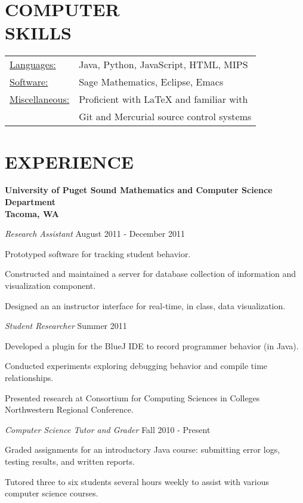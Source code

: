 \documentclass[line,margin,11pt]{res}
\newenvironment{itemize*}%
  {\begin{itemize}%
    \setlength{\parsep}{0pt}
    \setlength{\itemsep}{0pt}%
    \setlength{\parskip}{0pt}}%
  {\end{itemize}}
\begin{document}
\begin{resume}
\vspace*{.2cm}

\section{COMPUTER \\ SKILLS}
\begin{tabular}{l l}
   \underline{Languages:} & Java, Python, JavaScript, HTML, MIPS\\
   \underline{Software:} & Sage Mathematics, Eclipse, Emacs\\
   \underline{Miscellaneous:} & Proficient with LaTeX and familiar with\\
        & Git and Mercurial source control systems
  \end{tabular}

\vspace*{.2cm} 

\section{EXPERIENCE} 
\textbf{University of Puget Sound
Mathematics and Computer Science Department\\
Tacoma, WA}

{\sl Research Assistant} \hfill August 2011 - December 2011
\begin{itemize*}
    \item Prototyped software for tracking student behavior.
    \item Constructed and maintained a server for database collection of 
      information and visualization component.
    \item Designed an an instructor interface for real-time, in class, data 
      visualization.
\end{itemize*}            
{\sl Student Researcher} \hfill  Summer 2011
\begin{itemize*}  
    \item Developed a plugin for the BlueJ IDE to record 
      programmer behavior (in Java).
    \item Conducted experiments exploring debugging behavior and compile 
      time relationships.
    \item Presented research at Consortium for Computing Sciences in 
      Colleges Northwestern Regional Conference.
\end{itemize*} 
{\sl Computer Science Tutor and Grader} \hfill Fall 2010 - Present
\begin{itemize*}  
    \item Graded assignments for an introductory Java course: submitting 
      error logs, testing results, and written reports.
    \item Tutored three to six students several hours weekly to assist with 
      various computer science courses.
\end{itemize*}


\end{resume}
\end{document}
